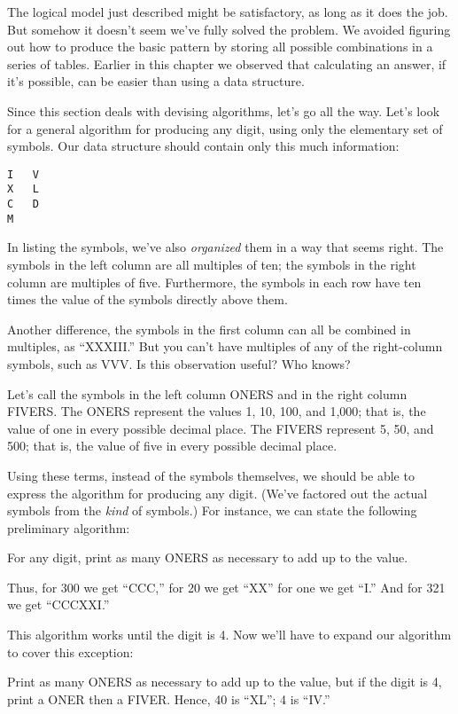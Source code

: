 The logical model just described might be satisfactory, as long as it
does the job. But somehow it doesn't seem we've fully solved the problem.
We avoided figuring out how to produce the basic pattern by storing
all possible combinations in a series of tables. Earlier in this chapter we
observed that calculating an answer, if it's possible, can be easier than
using a data structure.

Since this section deals with devising algorithms, let's go all the
way. Let's look for a general algorithm for producing any digit, using
only the elementary set of symbols. Our data structure should contain
only this much information:

\begin{verbatim}
I   V
X   L
C   D
M
\end{verbatim}

In listing the symbols, we've also \emph{organized} them in a way that seems
right. The symbols in the left column are all multiples of ten; the symbols
in the right column are multiples of five. Furthermore, the symbols in
each row have ten times the value of the symbols directly above them.

Another difference, the symbols in the first column can all be combined
in multiples, as ``XXXIII.'' But you can't have multiples of any of
the right-column symbols, such as VVV. Is this observation useful? Who
knows?

Let's call the symbols in the left column ONERS and in the right
column FIVERS. The ONERS represent the values 1, 10, 100, and 1,000;
that is, the value of one in every possible decimal place. The FIVERS
represent 5, 50, and 500; that is, the value of five in every possible
decimal place.

Using these terms, instead of the symbols themselves, we should be
able to express the algorithm for producing any digit. (We've factored
out the actual symbols from the \emph{kind} of symbols.) For instance, we can
state the following preliminary algorithm:

For any digit, print as many ONERS as necessary to add up to the value.

Thus, for 300 we get ``CCC,'' for 20 we get ``XX'' for one we get ``I.'' And
for 321 we get ``CCCXXI.''

This algorithm works until the digit is 4. Now we'll have to expand
our algorithm to cover this exception:

Print as many ONERS as necessary to add up to the value, but if the digit
is 4, print a ONER then a FIVER.
Hence, 40 is ``XL''; 4 is ``IV.''

